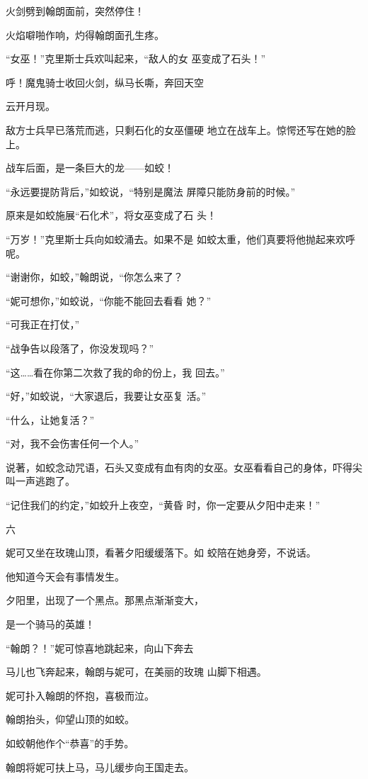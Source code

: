 \documentclass{article}
\begin{document}
火剑劈到翰朗面前，突然停住！ 


火焰噼啪作响，灼得翰朗面孔生疼。 

“女巫！”克里斯士兵欢叫起来，“敌人的女
巫变成了石头！” 

呼！魔鬼骑士收回火剑，纵马长嘶，奔回天空


云开月现。 

敌方士兵早已落荒而逃，只剩石化的女巫僵硬
地立在战车上。惊愕还写在她的脸上。 


战车后面，是一条巨大的龙——如蛟！ 

\newpage

“永远要提防背后，”如蛟说，“特别是魔法
屏障只能防身前的时候。” 

原来是如蛟施展“石化术”，将女巫变成了石
头！ 

“万岁！”克里斯士兵向如蛟涌去。如果不是
如蛟太重，他们真要将他抛起来欢呼呢。 

“谢谢你，如蛟，”翰朗说，“你怎么来了？

“妮可想你，”如蛟说，“你能不能回去看看
她？” 


“可我正在打仗，” 


“战争告以段落了，你没发现吗？” 

“这……看在你第二次救了我的命的份上，我
回去。” 

\newpage

“好，”如蛟说，“大家退后，我要让女巫复
活。” 


“什么，让她复活？” 


“对，我不会伤害任何一个人。” 

说著，如蛟念动咒语，石头又变成有血有肉的女巫。女巫看看自己的身体，吓得尖叫一声逃跑了。

“记住我们的约定，”如蛟升上夜空，“黄昏
时，你一定要从夕阳中走来！” 


六 

妮可又坐在玫瑰山顶，看著夕阳缓缓落下。如
蛟陪在她身旁，不说话。 


他知道今天会有事情发生。 

夕阳里，出现了一个黑点。那黑点渐渐变大，
\newpage

是一个骑马的英雄！ 

“翰朗？！”妮可惊喜地跳起来，向山下奔去

马儿也飞奔起来，翰朗与妮可，在美丽的玫瑰
山脚下相遇。 


妮可扑入翰朗的怀抱，喜极而泣。 


翰朗抬头，仰望山顶的如蛟。 


如蛟朝他作个“恭喜”的手势。 


翰朗将妮可扶上马，马儿缓步向王国走去。 
\end{document}
